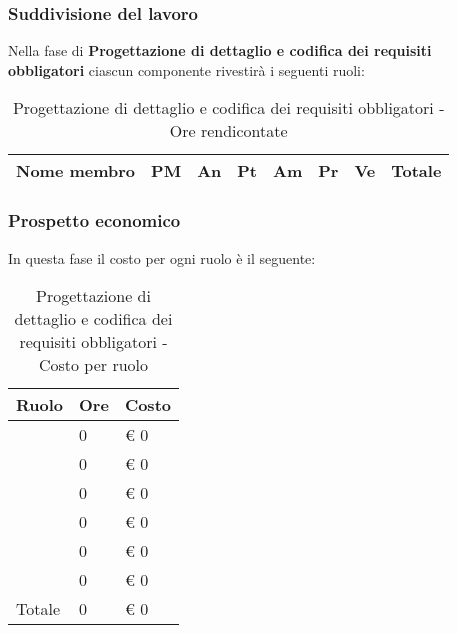		\subsubsection{Suddivisione del lavoro} %
		\label{ssub:suddivisione_del_lavoro}
		Nella fase di \textbf{Progettazione di dettaglio e codifica dei requisiti obbligatori} ciascun componente rivestirà i seguenti ruoli: \\
			\begin{table}[!h]
				\begin{center}
					\begin{tabularx}{0.9\textwidth}{|l|l|l|l|l|l|l|X|}
						\hline
						\textbf{Nome membro} & \textbf{PM} & \textbf{An} & \textbf{Pt} & \textbf{Am} & \textbf{Pr} & \textbf{Ve} & \textbf{Totale} \\
						\hline
					
						\hline		
					\end{tabularx}
				\end{center}
			\caption{Progettazione di dettaglio e codifica dei requisiti obbligatori - Ore rendicontate}
			\end{table}
		
		\subsubsection{Prospetto economico} %
		\label{ssub:prospetto_economico}
		In questa fase il costo per ogni ruolo è il seguente: \\
			\begin{table}[!h]
				\begin{center}
					\begin{tabularx}{0.6\textwidth}{|l|l|X|}
						\hline
						\textbf{Ruolo} & \textbf{Ore} & \textbf{Costo} \\
						\hline
						\roleProjectManager & 0 & \euro{} 0 \\
						\hline
						\roleAnalyst & 0 & \euro{} 0 \\
						\hline
						\roleDesigner & 0 & \euro{} 0 \\
						\hline
						\roleAdministrator & 0 & \euro{} 0 \\
						\hline
						\roleProgrammer & 0 & \euro{} 0 \\
						\hline
						\roleVerifier & 0 & \euro{} 0 \\
						\hline
						Totale & 0 & \euro{} 0 \\
						\hline
					\end{tabularx}
				\end{center}
			\caption{Progettazione di dettaglio e codifica dei requisiti obbligatori - Costo per ruolo}
			\end{table}
		

